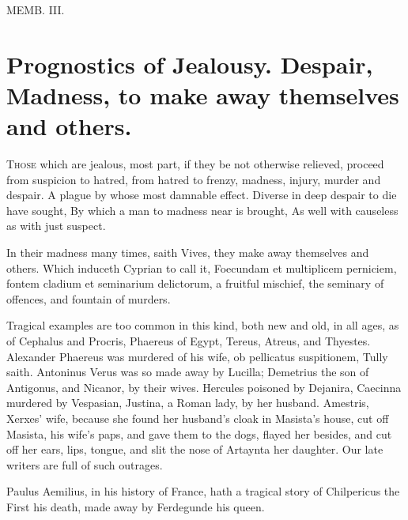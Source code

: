{MEMB. III.

\section[Prognostics of Jealousy.]{Prognostics of Jealousy. Despair, Madness, to make away themselves and others.}

\lettrine{T}{hose} which are jealous, most part, if they be not otherwise relieved,
proceed from suspicion to hatred, from hatred to frenzy, madness,
injury, murder and despair.
A plague by whose most damnable effect.
Diverse in deep despair to die have sought,
By which a man to madness near is brought,
As well with causeless as with just suspect.

In their madness many times, saith Vives, they make away
themselves and others. Which induceth Cyprian to call it, Foecundam et
multiplicem perniciem, fontem cladium et seminarium delictorum, a
fruitful mischief, the seminary of offences, and fountain of murders.

Tragical examples are too common in this kind, both new and old, in all
ages, as of  Cephalus and Procris, Phaereus of Egypt,
Tereus, Atreus, and Thyestes. Alexander Phaereus was murdered of
his wife, ob pellicatus suspitionem, Tully saith. Antoninus Verus was
so made away by Lucilla; Demetrius the son of Antigonus, and Nicanor,
by their wives. Hercules poisoned by Dejanira, Caecinna murdered
by Vespasian, Justina, a Roman lady, by her husband. Amestris,
Xerxes' wife, because she found her husband's cloak in Masista's house,
cut off Masista, his wife's paps, and gave them to the dogs, flayed her
besides, and cut off her ears, lips, tongue, and slit the nose of
Artaynta her daughter. Our late writers are full of such outrages.

Paulus Aemilius, in his history of France, hath a tragical story
of Chilpericus the First his death, made away by Ferdegunde his queen.

}
